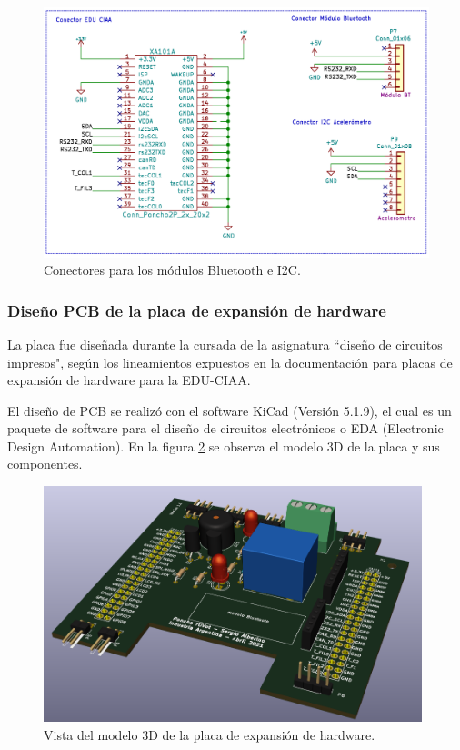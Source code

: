 \begin{figure}[h]
	\centering
	\includegraphics[width=13cm]{./Figures/conectorbt2.PNG}
	\caption{Conectores para los módulos Bluetooth e I2C.}
	\label{fig:conectorbt}
\end{figure}



		\subsubsection{Diseño PCB de la placa de expansión de hardware}


La placa fue diseñada durante la cursada de la asignatura “diseño de circuitos impresos", según los lineamientos expuestos en la documentación para placas de expansión de hardware para la EDU-CIAA. 

El diseño de PCB se realizó con el software KiCad \citep{KiCad} (Versión 5.1.9), el cual es un paquete de software para el diseño de circuitos electrónicos o EDA (Electronic Design Automation). En la figura \ref{fig:poncho3d} se observa el modelo 3D de la placa y sus componentes. 

\begin{figure}[h]
	\centering
	\includegraphics[width=11cm]{./Figures/ponchoiso.PNG}
	\caption{Vista del modelo 3D de la placa de expansión de hardware.}
	\label{fig:poncho3d}
\end{figure}

